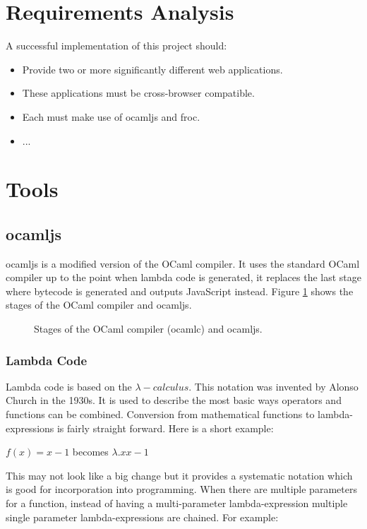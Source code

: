 \section{Requirements Analysis}
A successful implementation of this project should:
\begin{itemize}
\item Provide two or more significantly different web applications.
\item These applications must be cross-browser compatible.
\item Each must make use of ocamljs and froc.
\item ...
\end{itemize}

\section{Tools}

\subsection{ocamljs}
ocamljs is a modified version of the OCaml compiler. It uses the standard OCaml compiler up to the point when lambda code is generated, it replaces the last stage where bytecode is generated and outputs JavaScript instead. Figure \ref{fig:ocamlc} shows the stages of the OCaml compiler and ocamljs. \cite{bib:oreilly}

\begin{figure}
  \caption{Stages of the OCaml compiler (ocamlc) and ocamljs.\cite{bib:oreilly}}
  \label{fig:ocamlc}
\end{figure}

\subsubsection{Lambda Code}
Lambda code is based on the $\lambda-calculus$. This notation was invented by Alonso Church in the 1930s. It is used to describe the most basic ways operators and functions can be combined. Conversion from mathematical functions to lambda-expressions is fairly straight forward. Here is a short example:\cite{bib:lambda}

$f(x) = x - 1$ becomes $\lambda.x x-1$

This may not look like a big change but it provides a systematic notation which is good for incorporation into programming. When there are multiple parameters for a function, instead of having a multi-parameter lambda-expression multiple single parameter lambda-expressions are chained. For example:

